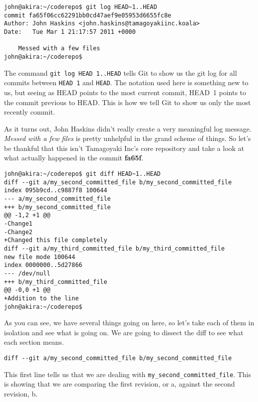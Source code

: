 \begin{Verbatim}[frame=leftline,framerule=1mm,fontsize=\relsize{-3}] 
john@akira:~/coderepo$ git log HEAD~1..HEAD
commit fa65f06cc62291bb0cd47aef9e05953d6655fc8e
Author: John Haskins <john.haskins@tamagoyakiinc.koala>
Date:   Tue Mar 1 21:17:57 2011 +0000

    Messed with a few files
john@akira:~/coderepo$ 
\end{Verbatim}

The command \texttt{git log HEAD~1..HEAD} tells Git to show us the git log for all commits between \texttt{HEAD~1} and \texttt{HEAD}.  The notation used here is something new to us, but seeing as HEAD points to the most current commit, HEAD~1 points to the commit previous to HEAD.  This is how we tell Git to show us only the most recently commit.  

As it turns out, John Haskins didn't really create a very meaningful log message.  \emph{Messed with a few files} is pretty unhelpful in the grand scheme of things.  So let's be thankful that this isn't Tamagoyaki Inc's core repository and take a look at what actually happened in the commit \textbf{fa65f}.

\begin{Verbatim}[frame=leftline,framerule=1mm,fontsize=\relsize{-3}] 
john@akira:~/coderepo$ git diff HEAD~1..HEAD
diff --git a/my_second_committed_file b/my_second_committed_file
index 095b9cd..c9887f8 100644
--- a/my_second_committed_file
+++ b/my_second_committed_file
@@ -1,2 +1 @@
-Change1
-Change2
+Changed this file completely
diff --git a/my_third_committed_file b/my_third_committed_file
new file mode 100644
index 0000000..5d27866
--- /dev/null
+++ b/my_third_committed_file
@@ -0,0 +1 @@
+Addition to the line
john@akira:~/coderepo$ 
\end{Verbatim}

As you can see, we have several things going on here, so let's take each of them in isolation and see what is going on.  We are going to dissect the diff to see what each section means.

\begin{Verbatim}[frame=leftline,framerule=1mm,fontsize=\relsize{-3}] 
diff --git a/my_second_committed_file b/my_second_committed_file
\end{Verbatim}

This first line tells us that we are dealing with \texttt{my\_second\_committed\_file}.  This is showing that we are comparing the first revision, or a, against the second revision, b.

